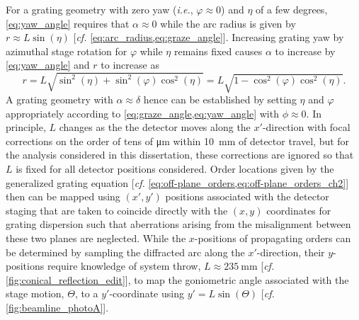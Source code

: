 For a grating geometry with zero yaw (\emph{i.e.}, $\varphi \approx 0$) and $\eta$ of a few degrees, \cref{eq:yaw_angle} requires that $\alpha \approx 0$ while the arc radius is given by $r \approx L \sin \left( \eta \right)$ [\emph{cf.\@} \cref{eq:arc_radius,eq:graze_angle}]. 
Increasing grating yaw by azimuthal stage rotation for $\varphi$ while $\eta$ remains fixed causes $\alpha$ to increase by \cref{eq:yaw_angle} and $r$ to increase as 
\begin{equation}
 r = L \sqrt{\sin^2 \left( \eta \right) + \sin^2 \left( \varphi \right) \cos^2 \left( \eta \right)} = L \sqrt{1 - \cos^2 \left( \varphi \right) \cos^2 \left( \eta \right)} .
 \end{equation}
A grating geometry with $\alpha \approx \delta$ hence can be established by setting $\eta$ and $\varphi$ appropriately according to \cref{eq:graze_angle,eq:yaw_angle} with $\phi \approx 0$. 
In principle, $L$ changes as the the detector moves along the $x'$-direction with focal corrections on the order of tens of \si{\um} within \SI{10}{mm} of detector travel, but for the analysis considered in this dissertation, these corrections are ignored so that $L$ is fixed for all detector positions considered. 
Order locations given by the generalized grating equation [\emph{cf.\@} \cref{eq:off-plane_orders,eq:off-plane_orders_ch2}] then can be mapped using $(x',y')$ positions associated with the detector staging that are taken to coincide directly with the $(x,y)$ coordinates for grating dispersion such that aberrations arising from the misalignment between these two planes are neglected. 
While the $x$-positions of propagating orders can be determined by sampling the diffracted arc along the $x'$-direction, their $y$-positions require knowledge of system throw, $L \approx \SI{235}{\mm}$ [\emph{cf.\@} \cref{fig:conical_reflection_edit}], to map the goniometric angle associated with the stage motion, $\Theta$, to a $y'$-coordinate using $y' = L \sin \left( \Theta \right)$ [\emph{cf.\@} \cref{fig:beamline_photoA}]. 

